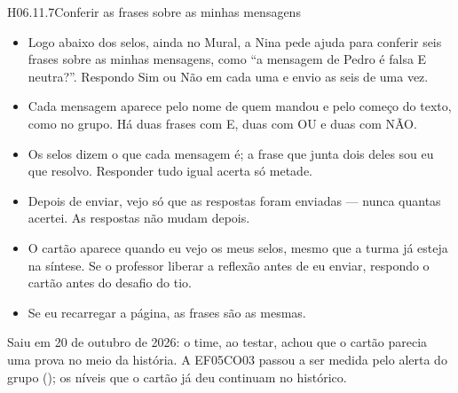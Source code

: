 \begin{historia}{H06.11.7}{Conferir as frases sobre as minhas mensagens}{\arquivada}
\aceite
\begin{itemize}
  \item Logo abaixo dos selos, ainda no Mural, a Nina pede ajuda para conferir
    seis frases sobre as minhas mensagens, como \enquote{a mensagem de Pedro é
    falsa E neutra?}. Respondo Sim ou Não em cada uma e envio as seis de uma
    vez.
  \item Cada mensagem aparece pelo nome de quem mandou e pelo começo do texto,
    como no grupo. Há duas frases com E, duas com OU e duas com NÃO.
  \item Os selos dizem o que cada mensagem é; a frase que junta dois deles sou
    eu que resolvo. Responder tudo igual acerta só metade.
  \item Depois de enviar, vejo só que as respostas foram enviadas --- nunca
    quantas acertei. As respostas não mudam depois.
  \item O cartão aparece quando eu vejo os meus selos, mesmo que a turma já
    esteja na síntese. Se o professor liberar a reflexão antes de eu enviar,
    respondo o cartão antes do desafio do tio.
  \item Se eu recarregar a página, as frases são as mesmas.
\end{itemize}
Saiu em 20 de outubro de 2026: o time, ao testar, achou que o cartão parecia
uma prova no meio da história. A EF05CO03 passou a ser medida pelo alerta do
grupo (); os níveis que o cartão já deu continuam no
histórico.
\end{historia}

